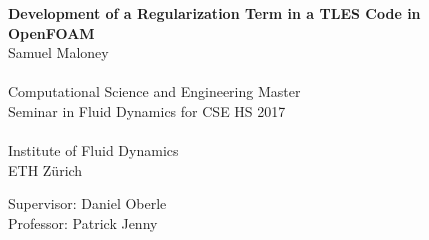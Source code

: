 \documentclass[smallheadings,headsepline,11pt,oneside,a4paper]{scrbook}
\begin{document}
\frontmatter						%


\begin{titlepage}
\begin{center}
    \vspace*{1cm}
    {\huge \bfseries  Development of a Regularization Term in a TLES Code in OpenFOAM\\ }
    \vspace{2cm}
    {\large 
	Samuel Maloney\\
	~\\
	Computational Science and Engineering Master\\
	\vspace{3.5cm}
	Seminar in Fluid Dynamics for CSE HS 2017\\
	~\\
	Institute of Fluid Dynamics\\
	ETH Zürich\\
    }




{\large
	Supervisor: Daniel Oberle\\[\baselineskip]
	Professor: Patrick Jenny
}
\end{center}

\vspace*{2cm} %

\end{titlepage}



\begin{titlepage}
\thispagestyle{empty}
\newpage
\mbox{}
\end{titlepage}







\tableofcontents
\end{document}
